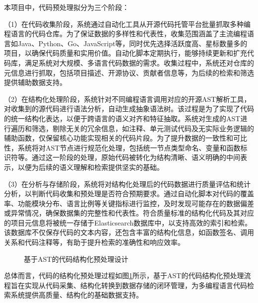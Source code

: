 \documentclass[UTF8,a4paper,12pt]{ctexart}
\numberwithin{equation}{section}
\begin{document}
本项目中，代码预处理拟分为三个阶段：\par
（1）在代码收集阶段，系统通过自动化工具从开源代码托管平台批量抓取多种编程语言的代码仓库。为了保证数据的多样性和代表性，收集范围涵盖了主流编程语言如Java、Python、Go、JavaScript等，同时优先选择活跃度高、星标数量多的项目，以确保代码质量和实用价值。自动化脚本定期执行，能够持续更新和扩充代码库，满足系统对大规模、多语言代码数据的需求。收集过程中，系统还对仓库的元信息进行抓取，包括项目描述、开源协议、贡献者信息等，为后续的检索和筛选提供辅助数据支持。\par
（2）在结构化处理阶段，系统针对不同编程语言调用对应的开源AST解析工具，对收集到的源代码进行语法分析，自动生成抽象语法树。该过程是为了实现了代码的统一结构化表达，以便于跨语言的语义对齐和特征抽取。系统对生成的AST进行遍历和筛选，剔除无关的冗余信息，如注释、单元测试代码及无实际业务逻辑的辅助函数，仅保留核心功能实现相关的代码片段。为了提升数据的一致性和可比性，系统将对AST节点进行规范化处理，包括统一节点类型命名、变量和函数标识符等。通过这一阶段的处理，原始代码被转化为结构清晰、语义明确的中间表示，以便为后续的语义理解和检索提供坚实的基础。\par
（3）在分析与存储阶段，系统将对结构化处理后的代码数据进行质量评估和统计分析，以判断代码收集和预处理是否符合预期要求。通过自动化脚本对代码的覆盖率、功能模块分布、语言比例等关键指标进行监控，及时发现可能存在的数据偏差或异常情况，确保数据集的完整性和代表性。符合质量标准的结构化代码及其对应的项目元信息将被统一存储于Elasticsearch数据库中，以支持高效的索引和检索。该数据库不仅保存代码的文本内容，还包含丰富的结构化信息，如函数签名、调用关系和代码注释等，有助于提升检索的准确性和响应效率。\par
\begin{figure}[H]
	\caption{基于AST的代码结构化预处理设计}
	\label{pre_pro}
\end{figure}
总体而言，代码的结构化预处理过程如图\ref{pre_pro}所示，基于AST的代码结构化预处理流程旨在实现从代码采集、结构化转换到数据存储的闭环管理，为多编程语言代码检索系统提供高质量、结构化的基础数据支持。\par
\end{document}
